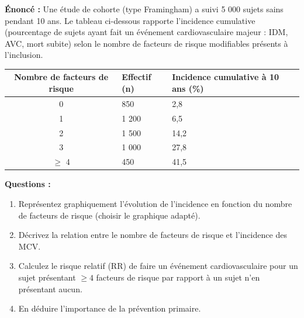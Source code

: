\documentclass[11pt]{article}
\begin{document}
\begin{exoresolu}
\textbf{Énoncé :} Une étude de cohorte (type Framingham) a suivi 5 000 sujets sains pendant 10 ans. Le tableau ci-dessous rapporte l'incidence cumulative (pourcentage de sujets ayant fait un événement cardiovasculaire majeur : IDM, AVC, mort subite) selon le nombre de facteurs de risque modifiables présents à l'inclusion.

\begin{center}
\begin{tabularx}{\linewidth}{|c|X|X|}\hline
\textbf{Nombre de facteurs de risque} & \textbf{Effectif (n)} & \textbf{Incidence cumulative à 10 ans (\%)} \\ \hline
0 & 850 & 2,8 \\
1 & 1 200 & 6,5 \\
2 & 1 500 & 14,2 \\
3 & 1 000 & 27,8 \\
$\ge$ 4 & 450 & 41,5 \\ \hline
\end{tabularx}
\end{center}

\textbf{Questions :}
\begin{enumerate}
    \item Représentez graphiquement l'évolution de l'incidence en fonction du nombre de facteurs de risque (choisir le graphique adapté).
    \item Décrivez la relation entre le nombre de facteurs de risque et l'incidence des MCV.
    \item Calculez le risque relatif (RR) de faire un événement cardiovasculaire pour un sujet présentant $\ge 4$ facteurs de risque par rapport à un sujet n'en présentant aucun.
    \item En déduire l'importance de la prévention primaire.
\end{enumerate}

\tcblower


\end{exoresolu}
\end{document}
